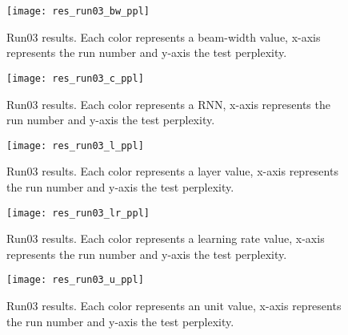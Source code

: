 \begin{landscape}
\begin{figure}
    \centering
    \texttt{[image: res\_run03\_bw\_ppl]}
    \decoRule
    \caption[Results run03 BW-PPL]{Run03 results. Each color represents a beam-width value, x-axis represents the run number and y-axis the test perplexity.}
    \label{fig:res_run03_bw_ppl}
\end{figure}
\begin{figure}
    \centering
    \texttt{[image: res\_run03\_c\_ppl]}
    \decoRule
    \caption[Results run03 C-PPL]{Run03 results. Each color represents a RNN, x-axis represents the run number and y-axis the test perplexity.}
    \label{fig:res_run03_c_ppl}
\end{figure}
\begin{figure}
    \centering
    \texttt{[image: res\_run03\_l\_ppl]}
    \decoRule
    \caption[Results run03 L-PPL]{Run03 results. Each color represents a layer value, x-axis represents the run number and y-axis the test perplexity.}
    \label{fig:res_run03_l_ppl}
\end{figure}
\begin{figure}
    \centering
    \texttt{[image: res\_run03\_lr\_ppl]}
    \decoRule
    \caption[Results run03 LR-PPL]{Run03 results. Each color represents a learning rate value, x-axis represents the run number and y-axis the test perplexity.}
    \label{fig:res_run03_lr_ppl}
\end{figure}
\begin{figure}
    \centering
    \texttt{[image: res\_run03\_u\_ppl]}
    \decoRule
    \caption[Results run03 U-PPL]{Run03 results. Each color represents an unit value, x-axis represents the run number and y-axis the test perplexity.}
    \label{fig:res_run03_u_ppl}
\end{figure}
\end{landscape}

%
